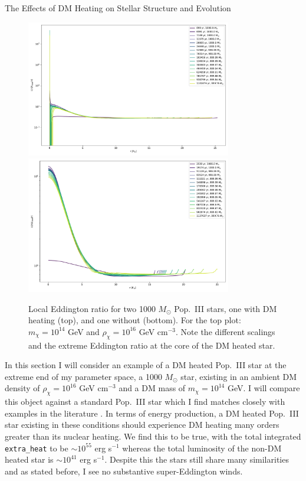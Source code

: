 \documentclass[a4paper,11pt]{article}
\begin{document}
\begin{section}{The Effects of DM Heating on Stellar Structure and Evolution}
\begin{figure}
    \end{figure}
    \begin{figure}
        \centering
        \includegraphics[trim={0 0.25cm 0 0.25cm},clip,width=0.8\textwidth]{Eddprof_DM.pdf}
        \includegraphics[trim={0 0.25cm 0 0.25cm},clip,width=0.8\textwidth]{Eddprof_noDM.pdf}
        \caption{Local Eddington ratio for two 1000 $M_\odot$ Pop.~III stars, one with DM heating (top), and one without (bottom). For the top plot: $m_\chi = 10^{14}$ GeV and $\rho_\chi = 10^{16}$ GeV cm$^{-3}$. Note the different scalings and the extreme Eddington ratio at the core of the DM heated star.}
        \label{eddplot}
    \end{figure}

    In this section I will consider an example of a DM heated Pop.~III star at the extreme end of my parameter space, a 1000 $M_\odot$ star, existing in an ambient DM density of $\rho_\chi = 10^{16}$ GeV cm$^{-3}$ and a DM mass of $m_\chi = 10^{14}$ GeV.
    I will compare this object against a standard Pop.~III star which I find matches closely with examples in the literature \cite{Windhorst:2019}.
    In terms of energy production, a DM heated Pop.~III star existing in these conditions should experience DM heating many orders greater than its nuclear heating.
    We find this to be true, with the total integrated \texttt{extra\_heat} to be $\sim 10^{55}$ erg s$^{-1}$ whereas the total luminosity of the non-DM heated star is $\sim 10^{41}$ erg s$^{-1}$.
    Despite this the stars still share many similarities and as stated before, I see no substantive super-Eddington winds.


\end{section}
\end{document}
